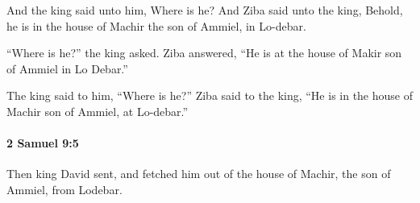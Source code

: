 			\begin{versebox}
					\item[BHS] 
					\item[ASV] And the king said unto him, Where is he? And Ziba said unto the king, Behold, he is in the house of Machir the son of Ammiel, in Lo-debar.
					\item[NIV] “Where is he?” the king asked. Ziba answered, “He is at the house of Makir son of Ammiel in Lo Debar.”
					\item[NRSV] The king said to him, “Where is he?” Ziba said to the king, “He is in the house of Machir son of Ammiel, at Lo-debar.”
			\end{versebox}

		\paragraph{2 Samuel 9:5} %
			\label{2SAMUEL-9-5}

			Then king David sent, and fetched him out of the house of Machir, the son of Ammiel, from Lodebar.

